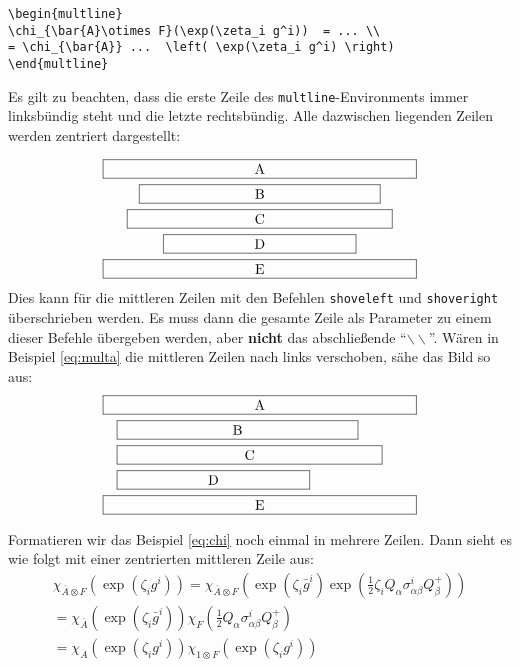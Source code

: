 \begin{verbatim}
\begin{multline}
\chi_{\bar{A}\otimes F}(\exp(\zeta_i g^i))  = ... \\
= \chi_{\bar{A}} ...  \left( \exp(\zeta_i g^i) \right)
\end{multline}
\end{verbatim}

Es gilt zu beachten, dass die erste Zeile des \texttt{multline}-Environments immer linksbündig steht und die letzte rechtsbündig. Alle dazwischen liegenden Zeilen werden zentriert dargestellt:

\begin{multline}\label{eq:multa}
\framebox[.65\columnwidth]{A}\\
\framebox[.5\columnwidth]{B}\\
\framebox[.55\columnwidth]{C}\\
\framebox[.4\columnwidth]{D}\\
\framebox[.65\columnwidth]{E}
\end{multline}
Dies kann für die mittleren Zeilen mit den Befehlen \texttt{shoveleft} und \texttt{shoveright} überschrieben werden. Es muss dann die gesamte Zeile als Parameter zu einem dieser Befehle übergeben werden, aber \textbf{nicht} das abschließende "`$\backslash\backslash$"'. Wären in Beispiel \ref{eq:multa} die mittleren Zeilen nach links verschoben, sähe das Bild so aus:
\begin{multline}\label{eq:multb}
\framebox[.65\columnwidth]{A}\\
\shoveleft{\framebox[.5\columnwidth]{B}}\\
\shoveleft{\framebox[.55\columnwidth]{C}}\\
\shoveleft{\framebox[.4\columnwidth]{D}}\\
\framebox[.65\columnwidth]{E}
\end{multline}

Formatieren wir das Beispiel \ref{eq:chi} noch einmal in mehrere Zeilen. Dann sieht es wie folgt mit einer zentrierten mittleren Zeile aus:
\begin{multline}
\chi_{\bar{A}\otimes F}(\exp(\zeta_i g^i)) = \chi_{\bar{A}\otimes F}\left( \exp(\zeta_i \bar{g}^i) \exp(\frac{1}{2} \zeta_i Q_\alpha \sigma^i_{\alpha \beta} Q^+_\beta)\right) \\
= \chi_{\bar{A}}\left( \exp(\zeta_i \bar{g}^i) \right) \chi_F \left( \frac{1}{2} Q_\alpha \sigma^i_{\alpha \beta} Q^+_\beta \right) \\
= \chi_A \left( \exp (\zeta_i g^i) \right) \chi_{1\otimes F} \left( \exp(\zeta_i g^i) \right)
\end{multline}


